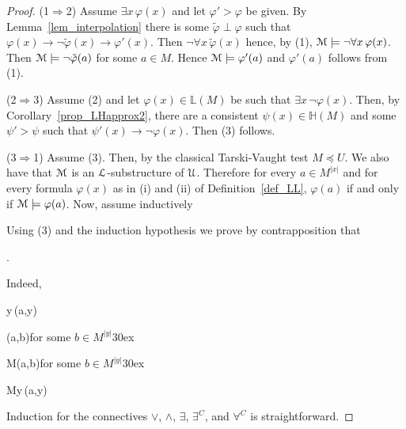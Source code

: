 \documentclass[11pt,oneside]{amsart}
\theoremstyle{plain}
\theoremstyle{remark}
\begin{document}
\begin{proof}
  (1$\Rightarrow$2) Assume $\exists x\,\varphi(x)$ and let $\varphi'>\varphi$ be given.
  By Lemma~\ref{lem_interpolation} there is some $\tilde{\varphi}\perp\varphi$ such that  $\varphi(x)\rightarrow\neg\tilde{\varphi}(x)\rightarrow\varphi'(x)$.
  Then $\neg\forall x\,\tilde{\varphi}(x)$ hence, by (1), ${\EuScript M}\models\neg\forall x\,\varphi(x)$.
  Then ${\EuScript M}\models\neg\tilde{\varphi}(a)$ for some $a\in M$. Hence ${\EuScript M}\models\varphi'(a)$ and $\varphi'(a)$ follows from (1).

  (2$\Rightarrow$3)
  Assume (2) and let $\varphi(x)\in\mathds{L}(M)$ be such that $\exists x\,\neg\varphi(x)$.
  Then, by Corollary~\ref{prop_LHapprox2}, there are a consistent $\psi(x)\in\mathds{H}(M)$ and some $\psi'>\psi$ such that $\psi'(x)\rightarrow\neg\varphi(x)$.
  Then (3) follows.

  (3$\Rightarrow$1)
  Assume (3).
  Then, by the classical Tarski-Vaught test $M\preceq U$.
  We also have that  ${\EuScript M}$ is an ${\EuScript L}$-substructure of ${\EuScript U}$.
  Therefore for every $a\in M^{|x|}$ and for every formula $\varphi(x)$ as in (i) and (ii) of Definition~\ref{def_LL}, $\varphi(a)$ if and only if ${\EuScript M}\models\varphi(a)$.
  Now, assume inductively
  

  Using (3) and the induction hypothesis we prove by contrapposition that

  .

  Indeed,

  {\Rightarrow}{\exists y\,\neg\varphi(a,y)}
  
  \ceq{}
  {\Rightarrow}
  {\neg\varphi(a,b)}\hfill for some $b\in M^{|y|}$\kern30ex

  \ceq{}
  {\Rightarrow}
  {{\EuScript M}\models\neg\varphi(a,b)}\hfill for some $b\in M^{|y|}$\kern30ex

  \ceq{}
  {\Rightarrow}
  {{\EuScript M}\not\models\forall y\,\varphi(a,y)}

  Induction for the connectives $\vee$, $\wedge$, $\exists$, $\exists^C$, and $\forall^C$ is straightforward.
\end{proof}

\end{document}
